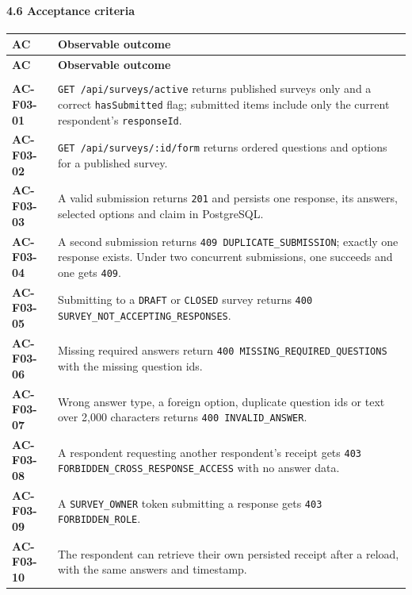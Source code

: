 \documentclass[12pt,a4paper]{article}
\begin{document}
\paragraph*{4.6 Acceptance criteria}
{\setlength{\tabcolsep}{3pt}\renewcommand{\arraystretch}{1.08}\small
\begin{longtable}{@{}>{\raggedright\arraybackslash}p{}>{\raggedright\arraybackslash}p{}@{}}
\toprule
\textbf{AC} & \textbf{Observable outcome} \\
\midrule
\endfirsthead
\toprule
\textbf{AC} & \textbf{Observable outcome} \\
\midrule
\endhead
\midrule
\multicolumn{2}{r}{\footnotesize\textit{Continued on next page}}\\
\endfoot
\bottomrule
\endlastfoot
\textbf{AC-F03-01} & \texttt{GET /api/surveys/active} returns published surveys only and a correct \texttt{hasSubmitted} flag; submitted items include only the current respondent's \texttt{responseId}. \\
\textbf{AC-F03-02} & \texttt{GET /api/surveys/:id/form} returns ordered questions and options for a published survey. \\
\textbf{AC-F03-03} & A valid submission returns \texttt{201} and persists one response, its answers, selected options and claim in PostgreSQL. \\
\textbf{AC-F03-04} & A second submission returns \texttt{409 DUPLICATE\_SUBMISSION}; exactly one response exists. Under two concurrent submissions, one succeeds and one gets \texttt{409}. \\
\textbf{AC-F03-05} & Submitting to a \texttt{DRAFT} or \texttt{CLOSED} survey returns \texttt{400 SURVEY\_NOT\_ACCEPTING\_RESPONSES}. \\
\textbf{AC-F03-06} & Missing required answers return \texttt{400 MISSING\_REQUIRED\_QUESTIONS} with the missing question ids. \\
\textbf{AC-F03-07} & Wrong answer type, a foreign option, duplicate question ids or text over 2,000 characters returns \texttt{400 INVALID\_ANSWER}. \\
\textbf{AC-F03-08} & A respondent requesting another respondent's receipt gets \texttt{403 FORBIDDEN\_CROSS\_RESPONSE\_ACCESS} with no answer data. \\
\textbf{AC-F03-09} & A \texttt{SURVEY\_OWNER} token submitting a response gets \texttt{403 FORBIDDEN\_ROLE}. \\
\textbf{AC-F03-10} & The respondent can retrieve their own persisted receipt after a reload, with the same answers and timestamp. \\
\end{longtable}}
\end{document}
